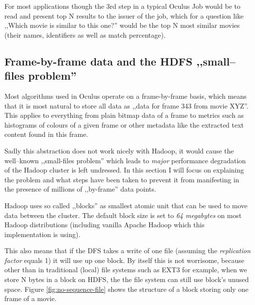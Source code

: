 For most applications though the 3rd step in a typical Oculus Job would be to read and present top N results to the issuer of the job, which for a question like ,,Which movie is similar to this one?'' would be the top N most similar movies (their names, identifiers as well as match percentage).

\subsection{Frame-by-frame data and the HDFS ,,small--files problem''}
\label{sec:sequence-files}
Most algorithms used in Oculus operate on a frame-by-frame basis, which means that it is most natural to store all data as ,,data for frame 343 from movie XYZ''.
This applies to everything from plain bitmap data of a frame to metrics such as histograms of colours of a given frame or other metadata like the extracted text content found in this frame.

Sadly this abstraction does not work nicely with Hadoop, it would cause the well--known ,,small-files problem'' which leads to \textit{major} performance degradation of the Hadoop cluster is left undressed. In this section I will focus on explaining the problem and what steps have been taken to prevent it from manifesting in the presence of millions of ,,by-frame'' data points.

Hadoop uses so called ,,blocks'' as smallest atomic unit that can be used to move data between the cluster.
The default block size is set to \textit{64 megabytes} on most Hadoop distributions (including vanilla Apache Hadoop which this implementation is using).

This also means that if the DFS takes a write of one file (assuming the \textit{replication factor} equals 1) it will use up one block.
By itself this is not worrisome, because other than in traditional (local) file systems such as EXT3 for example, when we store N bytes in a block on HDFS,
the the file system can still use block's unused space. Figure \ref{fig:no-sequence-file} shows the structure of a block storing only one frame of a movie.

